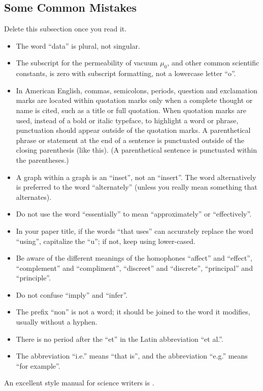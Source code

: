 \documentclass[conference]{IEEEtran}
\begin{document}
\subsection{Some Common Mistakes}\label{SCM}
Delete this subsection once you read it.
\begin{itemize}
\item The word ``data'' is plural, not singular.
\item The subscript for the permeability of vacuum $\mu_{0}$, and other common scientific constants, is zero with subscript formatting, not a lowercase letter ``o''.
\item In American English, commas, semicolons, periods, question and exclamation marks are located within quotation marks only when a complete thought or name is cited, such as a title or full quotation. When quotation marks are used, instead of a bold or italic typeface, to highlight a word or phrase, punctuation should appear outside of the quotation marks. A parenthetical phrase or statement at the end of a sentence is punctuated outside of the closing parenthesis (like this). (A parenthetical sentence is punctuated within the parentheses.)
\item A graph within a graph is an ``inset'', not an ``insert''. The word alternatively is preferred to the word ``alternately'' (unless you really mean something that alternates).
\item Do not use the word ``essentially'' to mean ``approximately'' or ``effectively''.
\item In your paper title, if the words ``that uses'' can accurately replace the word ``using'', capitalize the ``u''; if not, keep using lower-cased.
\item Be aware of the different meanings of the homophones ``affect'' and ``effect'', ``complement'' and ``compliment'', ``discreet'' and ``discrete'', ``principal'' and ``principle''.
\item Do not confuse ``imply'' and ``infer''.
\item The prefix ``non'' is not a word; it should be joined to the word it modifies, usually without a hyphen.
\item There is no period after the ``et'' in the Latin abbreviation ``et al.''.
\item The abbreviation ``i.e.'' means ``that is'', and the abbreviation ``e.g.'' means ``for example''.
\end{itemize}
An excellent style manual for science writers is \cite{b7}.
\end{document}
